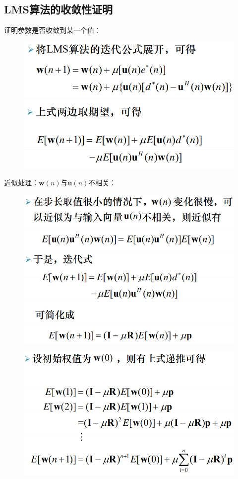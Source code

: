 \documentclass[UTF8]{ctexart} %
\begin{document}
		\subsection{LMS算法的收敛性证明}
			证明参数是否收敛到某一个值：
			\begin{figure}[H]
				\centering\includegraphics[scale=0.4]{24.png}
			\end{figure}
			近似处理：$\textbf{w}(n)$与$\textbf{u}(n)$不相关：
			\begin{figure}[H]
				\centering\includegraphics[scale=0.4]{25.png}
			\end{figure}
			\begin{figure}[H]
				\centering\includegraphics[scale=0.4]{26.png}
			\end{figure}
\end{document}
